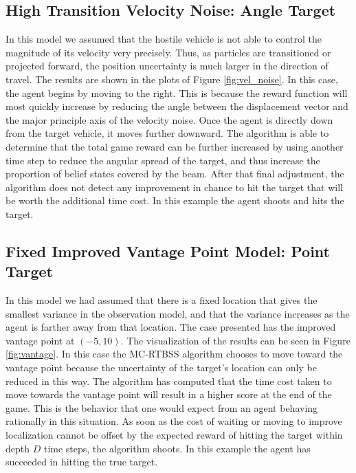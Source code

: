 	

\subsection{High Transition Velocity Noise: Angle Target}
	In this model we assumed that the hostile vehicle is not able to control the magnitude of its velocity very precisely.  Thus, as particles are transitioned or projected forward, the position uncertainty is much larger in the direction of travel.  The results are shown in the plots of Figure \ref{fig:vel_noise}.  In this case, the agent begins by moving to the right.  This is because the reward function will most quickly increase by reducing the angle between the displacement vector and the major principle axis of the velocity noise.  Once the agent is directly down from the target vehicle, it moves further downward.  The algorithm is able to determine that the total game reward can be further increased by using another time step to reduce the angular spread of the target, and thus increase the proportion of belief states covered by the beam.  After that final adjustment, the algorithm does not detect any improvement in chance to hit the target that will be worth the additional time cost.  In this example the agent shoots and hits the target.
	
	
\break
\subsection{Fixed Improved Vantage Point Model: Point Target}
	In this model we had assumed that there is a fixed location that gives the smallest variance in the observation model, and that the variance increases as the agent is farther away from that location.  The case presented has the improved vantage point at $(-5,10)$.  The visualization of the results can be seen in Figure \ref{fig:vantage}.  In this case the MC-RTBSS algorithm chooses to move toward the vantage point because the uncertainty of the target's location can only be reduced in this way.  The algorithm has computed that the time cost taken to move towards the vantage point will result in a higher score at the end of the game.  This is the behavior that one would expect from an agent behaving rationally in this situation.  As soon as the cost of waiting or moving to improve localization cannot be offset by the expected reward of hitting the target within depth $D$ time steps, the algorithm shoots.  In this example the agent has succeeded in hitting the true target.

	
	